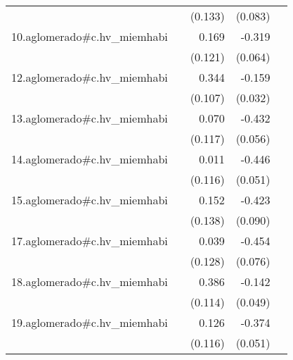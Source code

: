 {\begin{longtable}{l*{4}{D{.}{.}{-1}}}
            &                     &     (0.133)         &     (0.083)         &                     \\
\addlinespace
10.aglomerado#c.hv\_miemhabi&                     &       0.169         &      -0.319\sym{***}&                     \\
            &                     &     (0.121)         &     (0.064)         &                     \\
\addlinespace
12.aglomerado#c.hv\_miemhabi&                     &       0.344\sym{**} &      -0.159\sym{***}&                     \\
            &                     &     (0.107)         &     (0.032)         &                     \\
\addlinespace
13.aglomerado#c.hv\_miemhabi&                     &       0.070         &      -0.432\sym{***}&                     \\
            &                     &     (0.117)         &     (0.056)         &                     \\
\addlinespace
14.aglomerado#c.hv\_miemhabi&                     &       0.011         &      -0.446\sym{***}&                     \\
            &                     &     (0.116)         &     (0.051)         &                     \\
\addlinespace
15.aglomerado#c.hv\_miemhabi&                     &       0.152         &      -0.423\sym{***}&                     \\
            &                     &     (0.138)         &     (0.090)         &                     \\
\addlinespace
17.aglomerado#c.hv\_miemhabi&                     &       0.039         &      -0.454\sym{***}&                     \\
            &                     &     (0.128)         &     (0.076)         &                     \\
\addlinespace
18.aglomerado#c.hv\_miemhabi&                     &       0.386\sym{***}&      -0.142\sym{**} &                     \\
            &                     &     (0.114)         &     (0.049)         &                     \\
\addlinespace
19.aglomerado#c.hv\_miemhabi&                     &       0.126         &      -0.374\sym{***}&                     \\
            &                     &     (0.116)         &     (0.051)         &                     \\

\end{longtable}}
